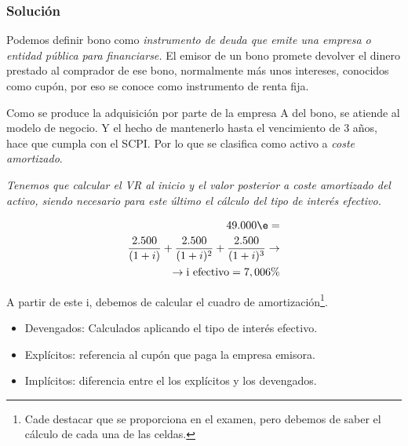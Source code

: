 \subsubsection*{Solución}

Podemos definir bono como \textit{instrumento de deuda que emite una empresa o entidad pública para financiarse.} El emisor de un bono promete devolver el dinero prestado al comprador de ese bono, normalmente más unos intereses, conocidos como cupón, por eso se conoce como instrumento de renta fija.

Como se produce la adquisición por parte de la empresa A del bono, se atiende al modelo de negocio. Y el hecho de mantenerlo hasta el vencimiento de 3 años, hace que cumpla con el SCPI. Por lo que se clasifica como activo a \textit{coste amortizado}.


\textit{Tenemos que calcular el VR al inicio y el valor posterior a coste amortizado del activo, siendo necesario para este último el cálculo del tipo de interés efectivo.}

\begin{align*}
    \text{49.000} \e = \\ 
    \frac{\text{2.500}}{(1+i)} + \frac{\text{2.500}}{(1+i)^2} + \frac{\text{2.500}}{(1+i)^3} \rightarrow \\
    \rightarrow \text{i efectivo} = 7,006\%
\end{align*}

A partir de este i, debemos de calcular el cuadro de amortización\footnote{Cade destacar que se proporciona en el examen, pero debemos de saber el cálculo de cada una de las celdas.}.

\begin{tcolorbox}[colback=yellow!5!white,colframe=yellow!75!black, title=Cálculo de intereses]
    \begin{itemize}
        \item Devengados: Calculados aplicando el tipo de interés efectivo.
        \item Explícitos: referencia al cupón que paga la empresa emisora.
        \item Implícitos: diferencia entre el los explícitos y los devengados.
    \end{itemize}
\end{tcolorbox}

